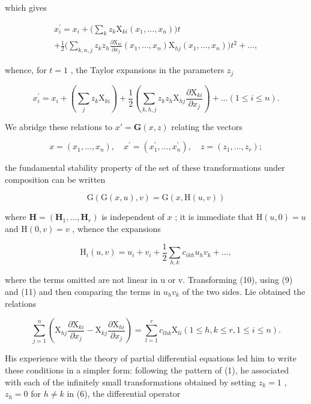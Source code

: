 which gives

\[
\begin{array}{r} x _ {i} ^ {\prime} = x _ {i} + \Big (\sum_ {k} z _ {k} \mathrm{X} _ {k i} (x _ {1}, \ldots , x _ {n}) \Big) t \\ + \frac {1}{2} \Big (\sum_ {k, n, j} z _ {k} z _ {h} \frac {\partial \mathrm{X} _ {k i}}{\partial x _ {j}} (x _ {1}, \ldots , x _ {n}) \mathrm{X} _ {h j} (x _ {1}, \ldots , x _ {n}) \Big) t ^ {2} + \dots , \end{array}
\]

whence, for \(t = 1\) , the Taylor expansions in the parameters \(z_{j}\)

\[
x _ {i} ^ {\prime} = x _ {i} + \left(\sum_ {j} z _ {k} \mathrm{X} _ {k i}\right) + \frac {1}{2} \left(\sum_ {k, h, j} z _ {k} z _ {h} \mathrm{X} _ {h j} \frac {\partial \mathrm{X} _ {k i}}{\partial x _ {j}}\right) + \dots (1 \leqslant i \leqslant n).\tag{9}
\]

We abridge these relations to \(x' = \mathbf{G}(x, z)\) relating the vectors

\[
x = (x _ {1}, \dots , x _ {n}), \quad x ^ {\prime} = (x _ {1} ^ {\prime}, \dots , x _ {n} ^ {\prime}), \quad z = (z _ {1}, \dots , z _ {r});
\]

the fundamental stability property of the set of these transformations under composition can be written

\[
\mathrm{G} (\mathrm{G} (x, u), v) = \mathrm{G} (x, \mathrm{H} (u, v))\tag{10}
\]

where \(\mathbf{H} = (\mathbf{H}_1, \ldots, \mathbf{H}_r)\) is independent of \(x\) ; it is immediate that \(\mathrm{H}(u, 0) = u\) and \(\mathrm{H}(0, v) = v\) , whence the expansions

\[
\mathrm{H} _ {i} (u, v) = u _ {i} + v _ {i} + \frac {1}{2} \sum_ {h, k} c _ {i k h} u _ {h} v _ {k} + \dots ,\tag{11}
\]

where the terms omitted are not linear in u or v. Transforming (10), using (9) and (11) and then comparing the terms in \(u_{h}v_{k}\) of the two sides. Lie obtained the relations

\[
\sum_ {j = 1} ^ {n} \left(\mathrm{X} _ {h j} \frac {\partial \mathrm{X} _ {k i}}{\partial x _ {j}} - \mathrm{X} _ {k j} \frac {\partial \mathrm{X} _ {h i}}{\partial x _ {j}}\right) = \sum_ {l = 1} ^ {r} c _ {l h k} \mathrm{X} _ {l i} (1 \leqslant h, k \leqslant r, 1 \leqslant i \leqslant n). \tag{12}
\]

His experience with the theory of partial differential equations led him to write these conditions in a simpler form: following the pattern of (1), he associated with each of the infinitely small transformations obtained by setting \(z_{k} = 1\) , \(z_{h} = 0\) for \(h \neq k\) in (6), the differential operator

